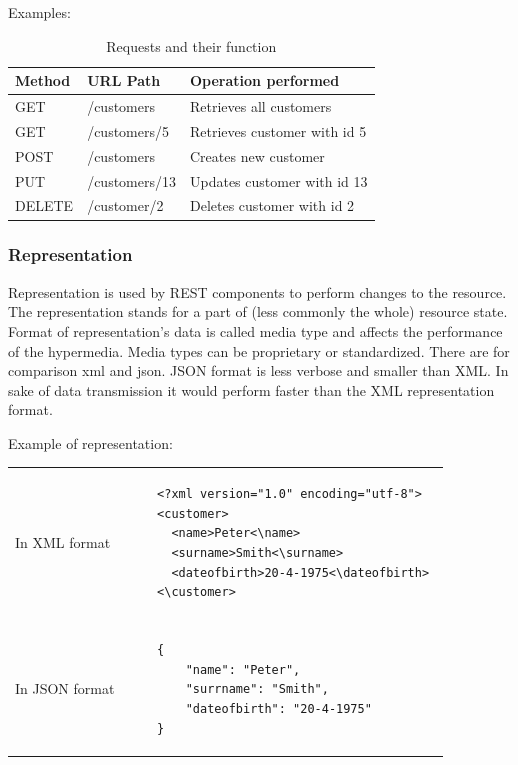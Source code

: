 Examples: \\
\begin{table}
\caption{Requests and their function}
\begin{center}
\begin{tabular}{l l l}
Method & URL Path & Operation performed \\ \hline
GET & /customers & Retrieves all customers \\
GET & /customers/5 & Retrieves customer with id 5 \\
POST & /customers & Creates new customer \\
PUT & /customers/13 & Updates customer with id 13 \\
DELETE & /customer/2 & Deletes customer with id 2 \\
\end{tabular}
\end{center}
\end{table}

\subsubsection{Representation}
  Representation is used by REST components to perform changes to the resource. The representation stands for a part of (less commonly the whole) resource state. Format of representation's data is called media type and affects the performance of the \gls{hypermedia}. Media types can be proprietary or standardized. There are for comparison \gls{xml} and \gls{json}. JSON format is less verbose and smaller than XML. In sake of data transmission it would perform faster than the XML representation format.
  
Example of representation:
\begin{center}
  \begin{tabular}[b]{l l}
    In XML format & \begin{lstlisting}
    <?xml version="1.0" encoding="utf-8">
    <customer> 
      <name>Peter<\name> 
      <surname>Smith<\surname> 
      <dateofbirth>20-4-1975<\dateofbirth> 
    <\customer>
    \end{lstlisting} \\
    
\\
    
    In JSON format & \begin{lstlisting}
    {
        "name": "Peter", 
        "surrname": "Smith", 
        "dateofbirth": "20-4-1975"
    }
    \end{lstlisting}
  \end{tabular}
\end{center}

